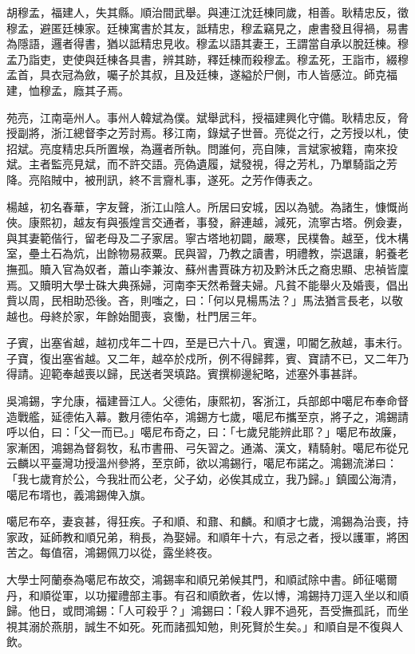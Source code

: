 \begin{pinyinscope}
胡穆孟，福建人，失其縣。順治間武舉。與連江沈廷棟同歲，相善。耿精忠反，徵穆孟，避匿廷棟家。廷棟寓書於其友，詆精忠，穆孟竊見之，慮書發且得禍，易書為隱語，邏者得書，猶以詆精忠見收。穆孟以語其妻王，王謂當自承以脫廷棟。穆孟乃詣吏，吏使與廷棟各具書，辨其跡，釋廷棟而殺穆孟。穆孟死，王詣市，綴穆孟首，具衣冠為斂，囑子於其叔，且及廷棟，遂縊於尸側，市人皆感泣。師克福建，恤穆孟，廕其子焉。

苑亮，江南亳州人。事州人韓斌為僕。斌舉武科，授福建興化守備。耿精忠反，脅授副將，浙江總督李之芳討焉。移江南，錄斌子世晉。亮從之行，之芳授以札，使招斌。亮度精忠兵所置堠，為邏者所執。問誰何，亮自陳，言斌家被籍，南來投斌。主者監亮見斌，而不許交語。亮偽遺履，斌發視，得之芳札，乃單騎詣之芳降。亮陷賊中，被刑訊，終不言齎札事，遂死。之芳作傳表之。

楊越，初名春華，字友聲，浙江山陰人。所居曰安城，因以為號。為諸生，慷慨尚俠。康熙初，越友有與張煌言交通者，事發，辭連越，減死，流寧古塔。例僉妻，與其妻範偕行，留老母及二子家居。寧古塔地初闢，嚴寒，民樸魯。越至，伐木構室，壘土石為炕，出餘物易菽粟。民與習，乃教之讀書，明禮教，崇退讓，躬養老撫孤。贖入官為奴者，蕭山李兼汝、蘇州書賈硃方初及黔沐氏之裔忠顯、忠禎皆廩焉。又贖明大學士硃大典孫婦，河南李天然希聲夫婦。凡貧不能舉火及婚喪，倡出貲以周，民相助恐後。吝，則嗤之，曰：「何以見楊馬法？」馬法猶言長老，以敬越也。母終於家，年餘始聞喪，哀慟，杜門居三年。

子賓，出塞省越，越初戍年二十四，至是已六十八。賓還，叩閽乞赦越，事未行。子寶，復出塞省越。又二年，越卒於戍所，例不得歸葬，賓、寶請不已，又二年乃得請。迎範奉越喪以歸，民送者哭填路。賓撰柳邊紀略，述塞外事甚詳。

吳鴻錫，字允康，福建晉江人。父德佑，康熙初，客浙江，兵部郎中噶尼布奉命督造戰艦，延德佑入幕。數月德佑卒，鴻錫方七歲，噶尼布攜至京，將子之，鴻錫請呼以伯，曰：「父一而已。」噶尼布奇之，曰：「七歲兒能辨此耶？」噶尼布故廉，家漸困，鴻錫為督芻牧，私市書冊、弓矢習之。通滿、漢文，精騎射。噶尼布從兄云麟以平臺灣功授溫州參將，至京師，欲以鴻錫行，噶尼布諾之。鴻錫流涕曰：「我七歲育於公，今我壯而公老，父子幼，必俟其成立，我乃歸。」鎮國公海清，噶尼布壻也，義鴻錫俾入旗。

噶尼布卒，妻哀甚，得狂疾。子和順、和鼐、和麟。和順才七歲，鴻錫為治喪，持家政，延師教和順兄弟，稍長，為娶婦。和順年十六，有忌之者，授以護軍，將困苦之。每值宿，鴻錫佩刀以從，露坐終夜。

大學士阿蘭泰為噶尼布故交，鴻錫率和順兄弟候其門，和順試除中書。師征噶爾丹，和順從軍，以功擢禮部主事。有召和順飲者，佐以博，鴻錫持刀逕入坐以和順歸。他日，或問鴻錫：「人可殺乎？」鴻錫曰：「殺人罪不過死，吾受撫孤託，而坐視其溺於燕朋，誠生不如死。死而諸孤知勉，則死賢於生矣。」和順自是不復與人飲。


\end{pinyinscope}
